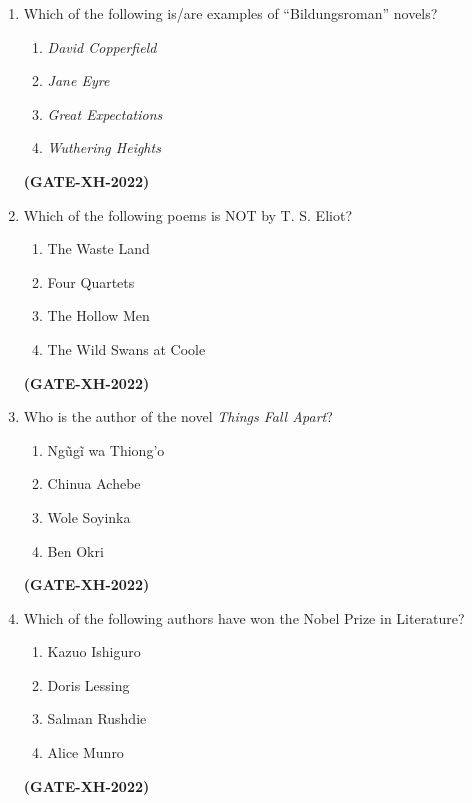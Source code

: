 \documentclass[journal]{IEEEtran}
\begin{document}
\begin{enumerate}
\item Which of the following is/are examples of ``Bildungsroman'' novels?
\begin{multicols}{2}
\begin{enumerate}
\item \textit{David Copperfield}
\item \textit{Jane Eyre}
\item \textit{Great Expectations}
\item \textit{Wuthering Heights}
\end{enumerate}
\end{multicols}
\hfill\textbf{(GATE-XH-2022)}

\item Which of the following poems is NOT by T. S. Eliot?
\begin{multicols}{2}
\begin{enumerate}
\item The Waste Land
\item Four Quartets
\item The Hollow Men
\item The Wild Swans at Coole
\end{enumerate}
\end{multicols}
\hfill\textbf{(GATE-XH-2022)}

\item Who is the author of the novel \textit{Things Fall Apart}?
\begin{multicols}{2}
\begin{enumerate}
\item Ngũgĩ wa Thiong’o
\item Chinua Achebe
\item Wole Soyinka
\item Ben Okri
\end{enumerate}
\end{multicols}
\hfill\textbf{(GATE-XH-2022)}

\item Which of the following authors have won the Nobel Prize in Literature?
\begin{multicols}{2}
\begin{enumerate}
\item Kazuo Ishiguro
\item Doris Lessing
\item Salman Rushdie
\item Alice Munro
\end{enumerate}
\end{multicols}
\hfill\textbf{(GATE-XH-2022)}


\end{enumerate}
\end{document}
